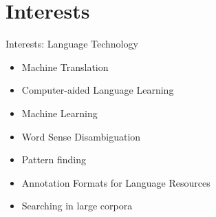 \documentclass[compress]{beamer}
\begin{document}
\section{Interests}






\begin{frame}

	\begin{block}{Interests: Language Technology}
		\begin{itemize}
			\item Machine Translation
			\item Computer-aided Language Learning
			\item Machine Learning
			\item Word Sense Disambiguation
			\item Pattern finding
			\item Annotation Formats for Language Resources
			\item Searching in large corpora
		\end{itemize}
	\end{block}
\end{frame}
\end{document}
